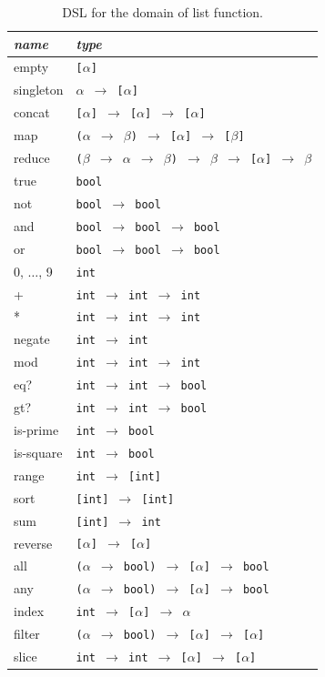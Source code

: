 \documentclass{article}
\begin{document}
\begin{table}
\centering
\begin{tabular}{| l | l |}
  \hline
  \emph{name} & \emph{type} \\
  \hline
    empty & \texttt{[$\alpha$]} \\
    singleton & \texttt{$\alpha$ $\rightarrow$ [$\alpha$]} \\
    concat & \texttt{[$\alpha$] $\rightarrow$ [$\alpha$] $\rightarrow$ [$\alpha$]} \\
    map & \texttt{($\alpha$ $\rightarrow$ $\beta$) $\rightarrow$ [$\alpha$] $\rightarrow$ [$\beta$]} \\
    reduce & \texttt{($\beta$ $\rightarrow$ $\alpha$ $\rightarrow$ $\beta$) $\rightarrow$ $\beta$ $\rightarrow$ [$\alpha$] $\rightarrow$ $\beta$} \\
    \hline
    true & \texttt{bool} \\
    not & \texttt{bool $\rightarrow$ bool} \\
    and & \texttt{bool $\rightarrow$ bool $\rightarrow$ bool} \\
    or & \texttt{bool $\rightarrow$ bool $\rightarrow$ bool} \\
    \hline
    0, $\ldots$, 9 & \texttt{int} \\
    + & \texttt{int $\rightarrow$ int $\rightarrow$ int} \\
    * & \texttt{int $\rightarrow$ int $\rightarrow$ int} \\
    negate & \texttt{int $\rightarrow$ int} \\
    mod & \texttt{int $\rightarrow$ int $\rightarrow$ int} \\
    eq? & \texttt{int $\rightarrow$ int $\rightarrow$ bool} \\
    gt? & \texttt{int $\rightarrow$ int $\rightarrow$ bool} \\
    is-prime & \texttt{int $\rightarrow$ bool} \\
    is-square & \texttt{int $\rightarrow$ bool} \\
    range & \texttt{int $\rightarrow$ [int]} \\
    sort & \texttt{[int] $\rightarrow$ [int]} \\
    \hline
    sum & \texttt{[int] $\rightarrow$ int} \\
    reverse & \texttt{[$\alpha$] $\rightarrow$ [$\alpha$]} \\
    all & \texttt{($\alpha$ $\rightarrow$ bool) $\rightarrow$ [$\alpha$] $\rightarrow$ bool} \\
    any & \texttt{($\alpha$ $\rightarrow$ bool) $\rightarrow$ [$\alpha$] $\rightarrow$ bool} \\
    index & \texttt{int $\rightarrow$ [$\alpha$] $\rightarrow$ $\alpha$} \\
    filter & \texttt{($\alpha$ $\rightarrow$ bool) $\rightarrow$ [$\alpha$] $\rightarrow$ [$\alpha$]} \\
    slice & \texttt{int $\rightarrow$ int $\rightarrow$ [$\alpha$] $\rightarrow$ [$\alpha$]} \\
  \hline
\end{tabular}
\caption{DSL for the domain of list function.}
\label{listdsl}
\end{table}
\end{document}
